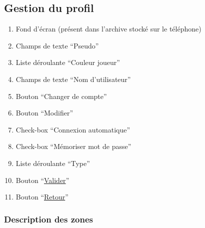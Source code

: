 \documentclass{report}
\begin{document}
	\subsection{Gestion du profil}
	
		\hypertarget{Gestion du profil}{}
		\label{Gestion du profil}
		
		\begin{center}
			
		\end{center}
				
		\begin{enumerate}
		  \item Fond d'écran (présent dans l'archive stocké sur le téléphone)
		  \item Champs de texte ``Pseudo''
		  \item Liste déroulante ``Couleur joueur''
		  \item Champs de texte ``Nom d'utilisateur''
		  \item Bouton ``Changer de compte''
		  \item Bouton ``Modifier''
		  \item Check-box ``Connexion automatique''
		  \item Check-box ``Mémoriser mot de passe''
		  \item Liste déroulante ``Type''
		  \item Bouton ``\hyperlink{Options}{Valider}''
		  \item Bouton ``\hyperlink{Options}{Retour}''
		\end{enumerate}

		\subsubsection{Description des zones}
		
\end{document}
